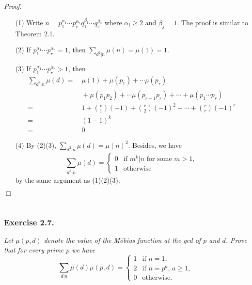 \documentclass{article}
\begin{document}
\emph{Proof.}
\begin{enumerate}
\item[(1)]
  Write $n = p_1^{\alpha_1} \cdots p_r^{\alpha_r} q_1^{\beta_1} \cdots q_s^{\beta_s}$
  where $\alpha_i \geq 2$ and $\beta_j = 1$.
  The proof is similar to Theorem 2.1.

\item[(2)]
  If $p_1^{\alpha_1} \cdots p_r^{\alpha_r} = 1$,
  then $\sum_{d^2 | n} \mu(n) = \mu(1) = 1$.

\item[(3)]
  If $p_1^{\alpha_1} \cdots p_r^{\alpha_r} > 1$,
  then
  \begin{align*}
    \sum_{d^2 | n} \mu(d)
    = & \: \mu(1) + \mu(p_1) + \cdots \mu(p_r) \\
      & \: + \mu(p_1 p_2) + \cdots \mu(p_{r-1} p_r) + \cdots + \mu(p_1 \cdots p_r) \\
    = & \: 1 + {r \choose 1}(-1) + {r \choose 2}(-1)^2 + \cdots + {r \choose r}(-1)^r \\
    = & \: (1-1)^k \\
    = & \: 0.
  \end{align*}

\item[(4)]
  By (2)(3), $\sum_{d^2 | n} \mu(d) = \mu(n)^2$.
  Besides, we have
  \begin{equation*}
    \sum_{d^k | n} \mu(d) =
    \begin{cases}
      0 & \text{if $m^k | n$ for some $m > 1$}, \\
      1 & \text{otherwise}
    \end{cases}
  \end{equation*}
  by the same argument as (1)(2)(3).
\end{enumerate}
$\Box$ \\\\






\subsubsection*{Exercise 2.7.}
\emph{Let $\mu(p,d)$ denote the value of the M\"obius function at the gcd of $p$ and $d$.
Prove that for every prime $p$ we have
\begin{equation*}
  \sum_{d|n} \mu(d) \mu(p,d) =
  \begin{cases}
    1 & \text{if $n = 1$}, \\
    2 & \text{if $n = p^a$, $a \geq 1$}, \\
    0 & \text{otherwise}.
  \end{cases}
\end{equation*}
} \\
\end{document}
